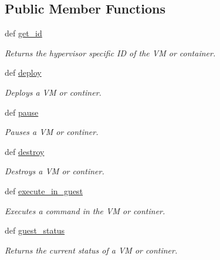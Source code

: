 \subsection*{Public Member Functions}
\begin{DoxyCompactItemize}
\item 
def \hyperlink{classhypervisor_1_1hypervisor__base_1_1HypervisorBase_aa06a6d5c765f477edc9b2121aa1477f8}{get\-\_\-id}
\begin{DoxyCompactList}\small\item\em Returns the hypervisor specific I\-D of the V\-M or container. \end{DoxyCompactList}\item 
def \hyperlink{classhypervisor_1_1hypervisor__base_1_1HypervisorBase_aaaecc9f6059daebb99596f7bae3b4c61}{deploy}
\begin{DoxyCompactList}\small\item\em Deploys a V\-M or continer. \end{DoxyCompactList}\item 
def \hyperlink{classhypervisor_1_1hypervisor__base_1_1HypervisorBase_ab4147962f621e47480a67da9dbab6ec7}{pause}
\begin{DoxyCompactList}\small\item\em Pauses a V\-M or continer. \end{DoxyCompactList}\item 
def \hyperlink{classhypervisor_1_1hypervisor__base_1_1HypervisorBase_a9fb778f97170ab9b0248a5048261f53e}{destroy}
\begin{DoxyCompactList}\small\item\em Destroys a V\-M or continer. \end{DoxyCompactList}\item 
def \hyperlink{classhypervisor_1_1hypervisor__base_1_1HypervisorBase_ab73d82fec1cbeadcc3b859310ebcf16e}{execute\-\_\-in\-\_\-guest}
\begin{DoxyCompactList}\small\item\em Executes a command in the V\-M or continer. \end{DoxyCompactList}\item 
def \hyperlink{classhypervisor_1_1hypervisor__base_1_1HypervisorBase_a4891d99be2c92c1082eab91b82a4ddad}{guest\-\_\-status}
\begin{DoxyCompactList}\small\item\em Returns the current status of a V\-M or continer. \end{DoxyCompactList}\end{DoxyCompactItemize}


